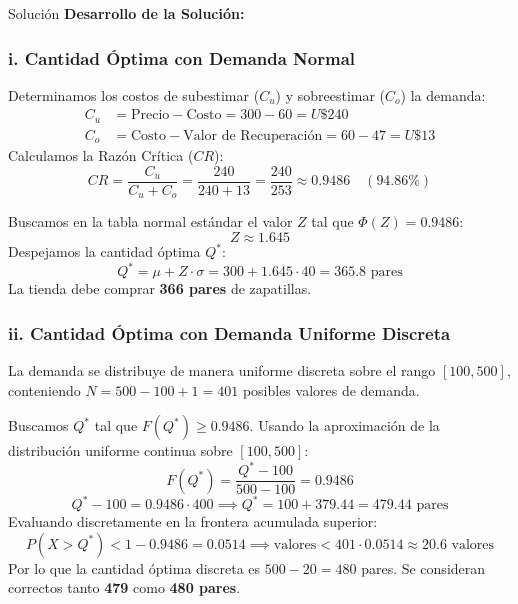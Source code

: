 \documentclass[11pt, a4paper]{article}
\begin{document}
  \medskip
  \begin{ejercicio}{Solución}
  \textbf{Desarrollo de la Solución:}

  \subsubsection*{i. Cantidad Óptima con Demanda Normal}
  Determinamos los costos de subestimar ($C_u$) y sobreestimar ($C_o$) la demanda:
  \begin{align*}
    C_u &= \text{Precio} - \text{Costo} = 300 - 60 = U\$240 \\
    C_o &= \text{Costo} - \text{Valor de Recuperación} = 60 - 47 = U\$13
  \end{align*}
  Calculamos la Razón Crítica ($CR$):
  \begin{equation*}
    CR = \frac{C_u}{C_u + C_o} = \frac{240}{240 + 13} = \frac{240}{253} \approx 0.9486 \quad (94.86\%)
  \end{equation*}

  Buscamos en la tabla normal estándar el valor $Z$ tal que $\Phi(Z) = 0.9486$:
  \begin{equation*}
    Z \approx 1.645
  \end{equation*}
  Despejamos la cantidad óptima $Q^*$:
  \begin{equation*}
    Q^* = \mu + Z \cdot \sigma = 300 + 1.645 \cdot 40 = 365.8 \text{ pares}
  \end{equation*}
  La tienda debe comprar \textbf{366 pares} de zapatillas.

  \subsubsection*{ii. Cantidad Óptima con Demanda Uniforme Discreta}
  La demanda se distribuye de manera uniforme discreta sobre el rango $[100, 500]$, conteniendo $N = 500 - 100 + 1 = 401$ posibles valores de demanda.
  
  Buscamos $Q^*$ tal que $F(Q^*) \ge 0.9486$. Usando la aproximación de la distribución uniforme continua sobre $[100, 500]$:
  \begin{equation*}
    F(Q^*) = \frac{Q^* - 100}{500 - 100} = 0.9486
  \end{equation*}
  \begin{equation*}
    Q^* - 100 = 0.9486 \cdot 400 \implies Q^* = 100 + 379.44 = 479.44 \text{ pares}
  \end{equation*}
  Evaluando discretamente en la frontera acumulada superior:
  \begin{equation*}
    P(X > Q^*) < 1 - 0.9486 = 0.0514 \implies \text{valores} < 401 \cdot 0.0514 \approx 20.6 \text{ valores}
  \end{equation*}
  Por lo que la cantidad óptima discreta es $500 - 20 = 480$ pares.
  Se consideran correctos tanto \textbf{479} como \textbf{480 pares}.


\end{ejercicio}
\end{document}
